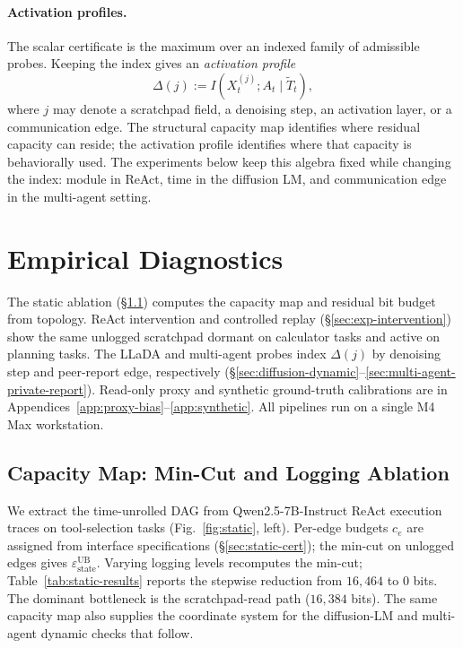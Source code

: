 \documentclass{article}
\begin{document}
  \paragraph{Activation profiles.}
  The scalar certificate is the maximum over an indexed family of admissible
  probes. Keeping the index gives an \emph{activation profile}
  \[
    \Delta(j) := I(X_t^{(j)}; A_t \mid \tilde T_t),
  \]
  where $j$ may denote a scratchpad field, a denoising step, an activation
  layer, or a communication edge.  The structural capacity map identifies where
  residual capacity can reside; the activation profile identifies where that
  capacity is behaviorally used.  The experiments below keep this algebra fixed
  while changing the index: module in ReAct, time in the diffusion LM, and
  communication edge in the multi-agent setting.

  \section{Empirical Diagnostics}
  \label{sec:empirical}

  The static ablation (\S\ref{sec:exp-static}) computes the capacity map and
  residual bit budget from topology. ReAct intervention and controlled replay
  (\S\ref{sec:exp-intervention}) show the same unlogged scratchpad dormant on
  calculator tasks and active on planning tasks. The LLaDA and multi-agent
  probes index $\Delta(j)$ by denoising step and peer-report edge, respectively
  (\S\ref{sec:diffusion-dynamic}--\ref{sec:multi-agent-private-report}).
  Read-only proxy and synthetic ground-truth calibrations are in
  Appendices~\ref{app:proxy-bias}--\ref{app:synthetic}. All pipelines run on a
  single M4 Max workstation.

  \subsection{Capacity Map: Min-Cut and Logging Ablation}
  \label{sec:exp-static} 

  We extract the time-unrolled DAG from Qwen2.5-7B-Instruct ReAct execution
  traces on tool-selection tasks (Fig.~\ref{fig:static}, left). Per-edge budgets
   $c_e$ are assigned from interface specifications (\S\ref{sec:static-cert});
  the min-cut on unlogged edges gives $\varepsilon_\text{state}^\text{UB}$.
  Varying logging levels recomputes the min-cut; Table~\ref{tab:static-results}
  reports the stepwise reduction from $16{,}464$ to $0$ bits. The dominant
  bottleneck is the scratchpad-read path ($16{,}384$ bits). The same capacity
  map also supplies the coordinate system for the diffusion-LM and
  multi-agent dynamic checks that follow.
\end{document}
